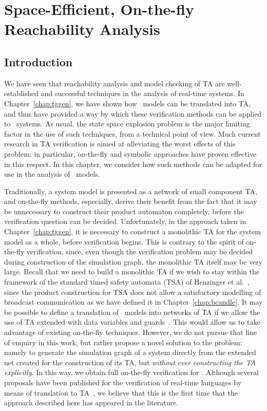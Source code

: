 \chapter{Space-Efficient, On-the-fly Reachability Analysis} \label{chap:sggen}
\section{Introduction}\label{sec:sgintro}
We have seen that reachability analysis and model checking of TA are
well-established and successful techniques in the analysis of
real-time systems. In Chapter~\ref{chap:tggen}, we have shown how
\bcandle\ models can be translated into TA, and thus have provided a
way by which these verification methods can be applied to \bcandle\
systems. As usual, the state space explosion problem is the major
limiting factor in the use of such techniques, from a technical point
of view. Much current research in TA verification is aimed at
alleviating the worst effects of this problem: in particular,
on-the-fly and symbolic approaches have proven effective in this
respect. In this chapter, we consider how such methods can be adapted for use
in the analysis of \bcandle\ models. 

Traditionally, a system model is presented as a network of small
component TA, and on-the-fly methods, especially, derive their benefit
from the fact that it may be unnecessary to construct their product
automaton completely, before the verification question can be decided.
Unfortunately, in the approach taken in Chapter~\ref{chap:tggen}, it
is necessary to construct a monolithic TA for the system model as a
whole, before verification begins. This is contrary to the spirit of
on-the-fly verification, since, even though the verification problem
may be decided during construction of the simulation graph, the
monolithic TA itself may be very large.  Recall that we need to build
a monolithic TA if we wish to stay within the framework of the
standard timed safety automata (TSA) of Henzinger et
al.~\cite{hnsy:94}, since the product construction for TSA does not
allow a satisfactory modelling of broadcast communication as we have
defined it in Chapter~\ref{chap:bcandle}. It may be possible to define
a translation of \bcandle\ models into networks of TA if we allow the
use of TA extended with data variables and
guards~\cite{alt:98,boz:98,lpy:97}. This would allow us to take
advantage of existing on-the-fly techniques. However, we do not pursue
that line of enquiry in this work, but rather propose a novel solution
to the problem: namely to generate the simulation graph of a system
directly from the extended net created for the construction of its TA,
but \emph{without ever constructing the TA explicitly}. In this way,
we obtain full on-the-fly verification for \bcandle.  Although several
proposals have been published for the verification of real-time
languages by means of translation to
TA~\cite{doy:94,her:98,jm:95,nsy:91}, we believe that this is the
first time that the approach described here has appeared in the
literature.

